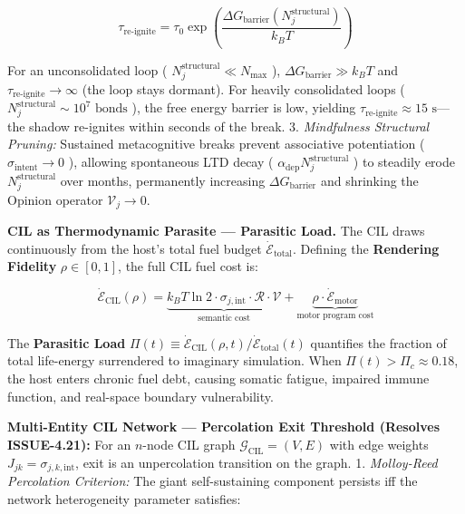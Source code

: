 \documentclass[11pt,a4paper]{article}
\theoremstyle{definition}
\theoremstyle{remark}
\begin{document}
\begin{equation}
\boxed{\tau_{\text{re-ignite}} = \tau_0 \exp\left(\frac{\Delta G_{\text{barrier}}\left(N_j^{\text{structural}}\right)}{k_B T}\right)}
\end{equation}


For an unconsolidated loop ( $N_j^{\text{structural}} \ll N_{\max}$ ), $\Delta G_{\text{barrier}} \gg k_B T$ and $\tau_{\text{re-ignite}} \to \infty$ (the loop stays dormant). For heavily consolidated loops ( $N_j^{\text{structural}} \sim 10^7\text{ bonds}$ ), the free energy barrier is low, yielding $\tau_{\text{re-ignite}} \approx 15\text{ s}$—the shadow re-ignites within seconds of the break.
3. \textit{Mindfulness Structural Pruning:} Sustained metacognitive breaks prevent associative potentiation ( $\sigma_{\text{intent}} \to 0$ ), allowing spontaneous LTD decay ( $\alpha_{\text{dep}} N_j^{\text{structural}}$ ) to steadily erode $N_j^{\text{structural}}$ over months, permanently increasing $\Delta G_{\text{barrier}}$ and shrinking the Opinion operator $\mathcal{V}_j \to 0$.

\textbf{CIL as Thermodynamic Parasite — Parasitic Load.} The CIL draws continuously from the host's total fuel budget $\dot{\mathcal{E}}_{\text{total}}$. Defining the \textbf{Rendering Fidelity} $\rho \in [0,1]$, the full CIL fuel cost is:


\begin{equation}
\boxed{\dot{\mathcal{E}}_{\text{CIL}}(\rho) = \underbrace{k_B T \ln 2 \cdot \sigma_{j,\text{int}} \cdot \mathcal{R} \cdot \mathcal{V}}_{\text{semantic cost}} + \underbrace{\rho \cdot \dot{\mathcal{E}}_{\text{motor}}}_{\text{motor program cost}}}
\end{equation}


The \textbf{Parasitic Load} $\Pi(t) \equiv \dot{\mathcal{E}}_{\text{CIL}}(\rho, t) / \dot{\mathcal{E}}_{\text{total}}(t)$ quantifies the fraction of total life-energy surrendered to imaginary simulation. When $\Pi(t) > \Pi_c \approx 0.18$, the host enters chronic fuel debt, causing somatic fatigue, impaired immune function, and real-space boundary vulnerability.

\textbf{Multi-Entity CIL Network — Percolation Exit Threshold (Resolves ISSUE-4.21):}
For an $n$-node CIL graph $\mathcal{G}_{\text{CIL}} = (V, E)$ with edge weights $J_{jk} = \sigma_{j,k,\text{int}}$, exit is an unpercolation transition on the graph.
1. \textit{Molloy-Reed Percolation Criterion:} The giant self-sustaining component persists iff the network heterogeneity parameter satisfies:
\end{document}
